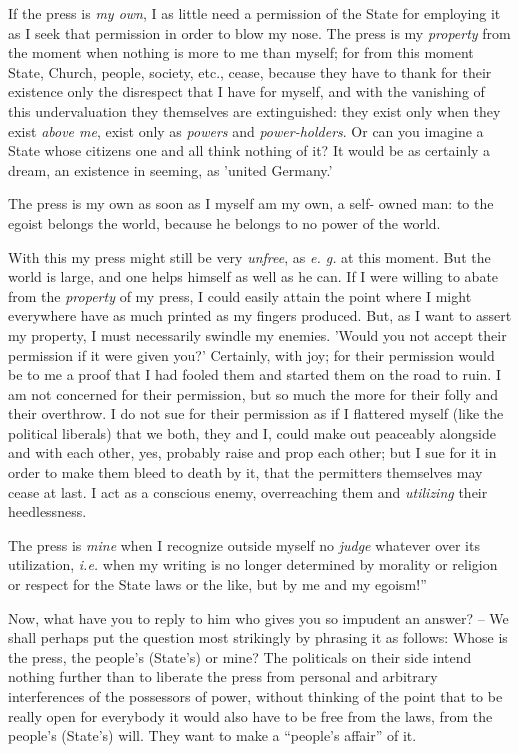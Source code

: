\documentclass[12pt,a4paper]{book}
\begin{document}
If the press is \textit{my own}, I as little need a permission of the State 
for employing it as I seek that permission in order to blow my nose. The press 
is my \textit{property} from the moment when nothing is more to me than 
myself; for from this moment State, Church, people, society, etc., cease, 
because they have to thank for their existence only the disrespect that I have 
for myself, and with the vanishing of this undervaluation they themselves are 
extinguished: they exist only when they exist \textit{above me}, exist only as 
\textit{powers} and \textit{power-holders}. Or can you imagine a State whose 
citizens one and all think nothing of it? It would be as certainly a dream, an 
existence in seeming, as 'united Germany.'

The press is my own as soon as I myself am my own, a self- owned man: to the 
egoist belongs the world, because he belongs to no power of the world.

With this my press might still be very \textit{unfree}, as \textit{e. g.} at 
this moment. But the world is large, and one helps himself as well as he can. 
If I were willing to abate from the \textit{property} of my press, I could 
easily attain the point where I might everywhere have as much printed as my 
fingers produced. But, as I want to assert my property, I must necessarily 
swindle my enemies. 'Would you not accept their permission if it were given 
you?' Certainly, with joy; for their permission would be to me a proof that I 
had fooled them and started them on the road to ruin. I am not concerned for 
their permission, but so much the more for their folly and their overthrow. I 
do not sue for their permission as if I flattered myself (like the political 
liberals) that we both, they and I, could make out peaceably alongside and 
with each other, yes, probably raise and prop each other; but I sue for it in 
order to make them bleed to death by it, that the permitters themselves may 
cease at last. I act as a conscious enemy, overreaching them and 
\textit{utilizing} their heedlessness.

The press is \textit{mine} when I recognize outside myself no \textit{judge} 
whatever over its utilization, \textit{i.e.} when my writing is no longer 
determined by morality or religion or respect for the State laws or the like, 
but by me and my egoism!''

Now, what have you to reply to him who gives you so impudent an answer? -- We 
shall perhaps put the question most strikingly by phrasing it as follows: 
Whose is the press, the people's (State's) or mine? The politicals on their 
side intend nothing further than to liberate the press from personal and 
arbitrary interferences of the possessors of power, without thinking of the 
point that to be really open for everybody it would also have to be free from 
the laws, from the people's (State's) will. They want to make a ``people's 
affair'' of it.
\end{document}
